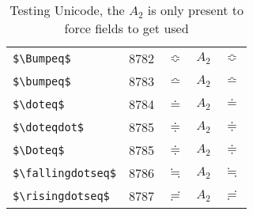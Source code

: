 \documentclass{article}
\begin{document}
\begin{table}
\begin{center}
\begin{tabular}{llll}
 \verb#$\Bumpeq$#         & 8782    & $\Bumpeq$         & $A_2\quad \Bumpeq$\\
 \verb#$\bumpeq$#         & 8783    & $\bumpeq$         & $A_2\quad \bumpeq$\\
 \verb#$\doteq$#          & 8784    & $\doteq$          & $A_2\quad \doteq$\\
 \verb#$\doteqdot$#       & 8785    & $\doteqdot$       & $A_2\quad \doteqdot$\\
 \verb#$\Doteq$#          & 8785    & $\Doteq$          & $A_2\quad \Doteq$\\
 \verb#$\fallingdotseq$#  & 8786    & $\fallingdotseq$  & $A_2\quad \fallingdotseq$\\
 \verb#$\risingdotseq$#   & 8787    & $\risingdotseq$   & $A_2\quad \risingdotseq$\\
\end{tabular}
\end{center}
\caption{Testing Unicode, the $A_2$ is only present to force fields to get used}
\end{table}
\clearpage
\end{document}
